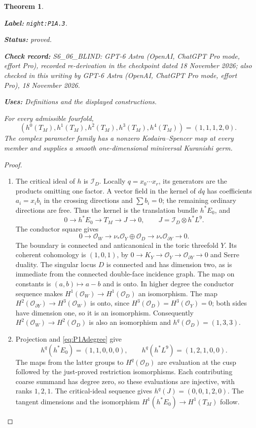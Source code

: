 \documentclass[11pt,a4paper]{article}
\newtheorem{theorem}{Theorem}[section]
\theoremstyle{definition}
\newcommand{\StatementRecord}[4]{\par\smallskip\begingroup\upshape\raggedright\noindent\textbf{Label:} \nolinkurl{#1}.\par\noindent\textbf{Status:} #2.\par\noindent\textbf{Check record:} #3.\par\noindent\textbf{Uses:} #4.\par\endgroup\smallskip}
\newcommand{\CurrentChecker}{GPT-6 Astra (OpenAI, ChatGPT Pro mode, effort Pro), 18 November 2026}
\begin{document}
\begin{theorem}\label{night:P1A.3}
\StatementRecord{night:P1A.3}{proved}{S6\_06\_BLIND: GPT-6 Astra (OpenAI, ChatGPT Pro mode, effort Pro), recorded re-derivation in the checkpoint dated 18 November 2026; also checked in this writing by \CurrentChecker}{Definitions and the displayed constructions}
For every admissible fourfold,
\[
 (h^0(T_M),h^1(T_M),h^2(T_M),h^3(T_M),h^4(T_M))
 =(1,1,1,2,0).
\]
The complex parameter family has a nonzero Kodaira--Spencer map
at every member and supplies a smooth one-dimensional miniversal
Kuranishi germ.
\end{theorem}
\begin{proof}
\begin{enumerate}[label=\arabic*.]
\item The critical ideal of $h$ is $\mathcal I_D$. Locally
$q=x_0\cdots x_r$, its generators are the products omitting
one factor. A vector field in the kernel of $dq$ has coefficients
$a_i=x_i b_i$ in the crossing directions and
$\sum b_i=0$; the remaining ordinary directions are free.
Thus the kernel is the translation bundle $h^*E_0$, and
\[
0\to h^*E_0\to T_M\to J\to0,
\qquad J=\mathcal I_D\otimes h^*L^9.
\]
The conductor square gives
\[
0\to\mathcal O_W\to\nu_*\mathcal O_Y\oplus\mathcal O_D
 \to\nu_*\mathcal O_{\partial Y}\to0.
\]
The boundary is connected and anticanonical in the toric
threefold $Y$. Its coherent cohomology is $(1,0,1)$, by
$0\to K_Y\to\mathcal O_Y\to\mathcal O_{\partial Y}\to0$
and Serre duality. The singular locus $D$ is connected and
has dimension two, as is immediate from the connected
double-face incidence graph. The map on constants is
$(a,b)\mapsto a-b$ and is onto. In higher degree the conductor
sequence makes $H^1(\mathcal O_W)\to H^1(\mathcal O_D)$
an isomorphism. The map
$H^2(\mathcal O_{\partial Y})\to H^3(\mathcal O_W)$ is onto,
since $H^3(\mathcal O_D)=H^3(\mathcal O_Y)=0$; both sides
have dimension one, so it is an isomorphism. Consequently
$H^2(\mathcal O_W)\to H^2(\mathcal O_D)$ is also an
isomorphism and $h^q(\mathcal O_D)=(1,3,3)$.

\item Projection and \eqref{eq:P1Adegree} give
\[
h^q(h^*E_0)=(1,1,0,0,0),\qquad
h^q(h^*L^9)=(1,2,1,0,0).
\]
The maps from the latter groups to $H^q(\mathcal O_D)$
are evaluation at the cusp followed by the just-proved
restriction isomorphisms. Each contributing coarse summand
has degree zero, so these evaluations are injective, with
ranks $1,2,1$. The critical-ideal sequence gives
$h^q(J)=(0,0,1,2,0)$. The tangent dimensions and the
isomorphism $H^1(h^*E_0)\to H^1(T_M)$ follow.


\end{enumerate}
\end{proof}
\end{document}
